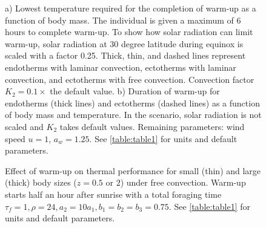 \begin{figure}[H]
\begin{center}
\caption{
    \setstretch{\stretchby}
	a) Lowest temperature required for the completion of warm-up as a function of body mass.
	The individual is given a maximum of 6 hours to complete warm-up.
	To show how solar radiation can limit warm-up, solar radiation at 30 degree latitude during equinox is scaled with a factor 0.25.
  Thick, thin, and dashed lines represent endotherms with laminar convection, ectotherms  with laminar convection, and ectotherms with free convection.
  Convection factor $K_2 = 0.1 \times$ the default value.
  b) Duration of warm-up for endotherms (thick lines) and ectotherms (dashed lines) as a function of body mass and temperature.
  In the scenario, solar radiation is not scaled and $K_2$ takes default values.
  Remaining parameters: wind speed  $u = 1$, $a_w = 1.25$.
	See \cref{table:table1} for units and default parameters.
}
\label{fig3}
\end{center}
\end{figure}
%
\begin{figure}[H]
\begin{center}
\caption{
    \setstretch{\stretchby}
Effect of warm-up on thermal performance for small (thin) and large (thick) body sizes ($z = 0.5 \mbox{ or } 2$) under free convection.
Warm-up starts half an hour after sunrise with a total foraging time $\tau_f = 1, \rho = 24, a_2 = 10 a_1, b_1 = b_2 = b_3 = 0.75.$
	See \cref{table:table1} for units and default parameters.
}
\label{fig4}
\end{center}
\end{figure}
